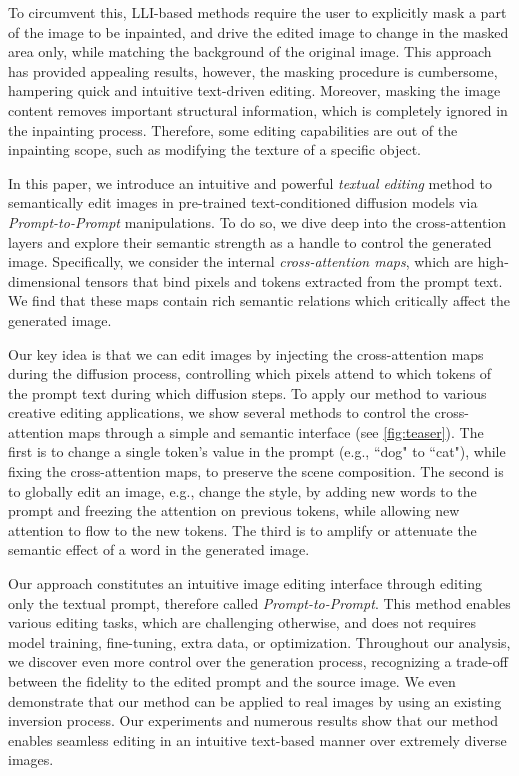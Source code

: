 To circumvent this, LLI-based methods \cite{nichol2021glide, avrahami2022blendedlatent, ramesh2022hierarchical} require the user to explicitly mask a part of the image to be inpainted, and drive the edited image to change in the masked area only, while matching the background of the original image. This approach has provided appealing results, however, the masking procedure is cumbersome, hampering quick and intuitive text-driven editing. Moreover, masking the image content removes important structural information, which is completely ignored in the inpainting process. Therefore, some editing capabilities are out of the inpainting scope, such as modifying the texture of a specific object.

In this paper, we introduce an intuitive and powerful \textit{textual editing} method to semantically edit images in pre-trained text-conditioned diffusion models via \textit{Prompt-to-Prompt} manipulations. To do so, we dive deep into the cross-attention layers and explore their semantic strength as a handle to control the generated image. Specifically, we consider the internal \textit{cross-attention maps}, which are high-dimensional tensors that bind pixels and tokens extracted from the prompt text. We find that these maps contain rich semantic relations which critically affect the generated image. 

Our key idea is that we can edit images by injecting the cross-attention maps during the diffusion process, controlling which pixels attend to which tokens of the prompt text during which diffusion steps. To apply our method to various creative editing applications, we show several methods to control the cross-attention maps through a simple and semantic interface (see \ref{fig:teaser}). The first is to change a single token's value in the prompt (e.g., ``dog" to ``cat"), while fixing the cross-attention maps, to preserve the scene composition. The second is to globally edit an image, e.g., change the style, by adding new words to the prompt and freezing the attention on previous tokens, while allowing new attention to flow to the new tokens. The third is to amplify or attenuate the semantic effect of a word in the generated image.

Our approach constitutes an intuitive image editing interface through editing only the textual prompt, therefore called \textit{Prompt-to-Prompt}. This method enables various editing tasks, which are challenging otherwise, and does not requires model training, fine-tuning, extra data, or optimization. Throughout our analysis, we discover even more control over the generation process, recognizing a trade-off between the fidelity to the edited prompt and the source image. We even demonstrate that our method can be applied to real images by using an existing inversion process. Our experiments and numerous results show that our method enables seamless editing in an intuitive text-based manner over extremely diverse images.

